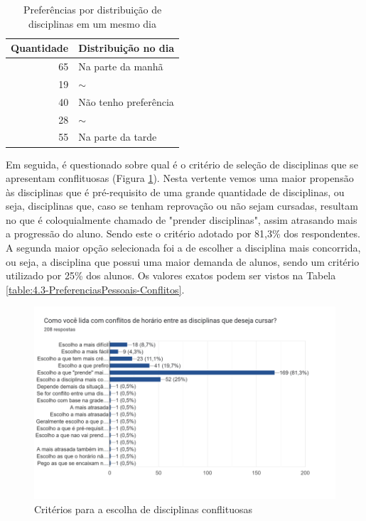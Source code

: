 \begin{table}[htbp]
  \centering
  \caption{\label{table:4.2-PreferenciasPessoais-Manha_Tarde}Preferências por distribuição de disciplinas em um mesmo dia}
  \begin{tabular}{| r l |}
    \hline
    \textbf{Quantidade} & \textbf{Distribuição no dia} \\
    \hline
    65                  & Na parte da manhã            \\
    19                  & $\sim$                       \\
    40                  & Não tenho preferência        \\
    28                  & $\sim$                       \\
    55                  & Na parte da tarde            \\
    \hline
  \end{tabular}
\end{table}

Em seguida, é questionado sobre qual é o critério de seleção de disciplinas que se apresentam conflituosas (Figura \ref{fig:4.3-PreferenciasPessoais-Conflitos}). Nesta vertente vemos uma maior propensão às disciplinas que é pré-requisito de uma grande quantidade de disciplinas, ou seja, disciplinas que, caso se tenham reprovação ou não sejam cursadas, resultam no que é coloquialmente chamado de "prender disciplinas", assim atrasando mais a progressão do aluno. Sendo este o critério adotado por 81,3\% dos respondentes. A segunda maior opção selecionada foi a de escolher a disciplina mais concorrida, ou seja, a disciplina que possui uma maior demanda de alunos, sendo um critério utilizado por 25\% dos alunos. Os valores exatos podem ser vistos na Tabela \ref{table:4.3-PreferenciasPessoais-Conflitos}.

\begin{figure}[htbp]\centering
  \caption{\label{fig:4.3-PreferenciasPessoais-Conflitos}Critérios para a escolha de disciplinas conflituosas}
  \includegraphics[scale=0.6]{files/img/Forms/4.3-PreferenciasPessoais-Conflitos.png}
\end{figure} %

